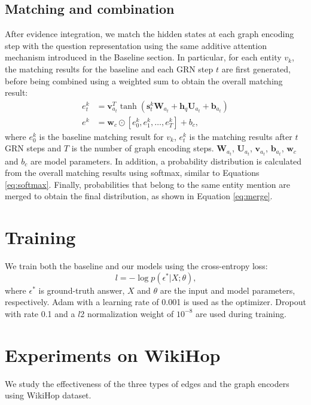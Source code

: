 \documentclass[letterpaper]{article}
\begin{document}
\subsection{Matching and combination}

After evidence integration, we match the hidden states at each graph encoding step with the question representation using the same additive attention mechanism introduced in the Baseline section.
In particular, for each entity $v_k$, the matching results for the baseline and each GRN step $t$ are first generated, before being combined using a weighted sum to obtain the overall matching result:
\begin{align}
e_t^k &= \boldsymbol{v}_{a_t}^T \tanh(\boldsymbol{s}_t^k \boldsymbol{W}_{a_t} + \boldsymbol{h}_q \boldsymbol{U}_{a_t} + \boldsymbol{b}_{a_t}) \\
e^k &= \boldsymbol{w}_c \odot [e_0^k, e_1^k, \dots, e_T^k] + b_c \textrm{,}
\end{align}
where $e_0^k$ is the baseline matching result for $v_k$, $e_t^k$ is the matching results after $t$ GRN steps and $T$ is the number of graph encoding steps. 
$\boldsymbol{W}_{a_t}$, $\boldsymbol{U}_{a_t}$, $\boldsymbol{v}_{a_t}$, $\boldsymbol{b}_{a_t}$, $\boldsymbol{w}_c$ and $b_c$ are model parameters.
In addition, a probability distribution is calculated from the overall matching results using softmax, similar to Equations \ref{eq:softmax}. 
Finally, probabilities that belong to the same entity mention are merged to obtain the final distribution, as shown in Equation \ref{eq:merge}.


\section{Training} 
We train both the baseline and our models using the cross-entropy loss:
\[
l = -\log p(\epsilon^*|X;\theta) \textrm{,}
\]
where $\epsilon^*$ is ground-truth answer, $X$ and $\theta$ are the input and model parameters, respectively.
Adam \citep{kingma2014adam} with a learning rate of 0.001 is used as the optimizer. 
Dropout with rate 0.1 and a $l$2 normalization weight of $10^{-8}$ are used during training.

\section{Experiments on WikiHop}

We study the effectiveness of the three types of edges and the graph encoders using WikiHop \citep{welbl2018constructing} dataset.
\end{document}
